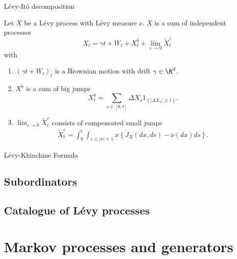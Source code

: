 \begin{frame}
    {L\'evy-It\^o decomposition}
    
    Let $X$ be a L\'evy process with L\'evy measure $\nu$. $X$ is a sum of
    independent processes
    \begin{equation*}
        X_t = \gamma t + W_t + X_t^{b} + \lim_{\varepsilon\to 0} \tilde X^{\varepsilon}_{t}
    \end{equation*}
    with
    \begin{enumerate}
        \item $\left( \gamma t + W_t \right)_{t}$ is a Brownian motion with drift $\gamma \in \R^d$.
        \item $X^b$ is a sum of big jumps
            \begin{equation*}
                X^{b}_t = \sum_{s\in [0,t]} \Delta X_s 1_{ \left\{ | \Delta X_s | \geq 1 \right\}  }.
            \end{equation*}
        \item $\lim_{\varepsilon\to 0}\tilde X^{\varepsilon}_t$ consists of compensated 
            small jumps
            \begin{align*}
                \tilde X^{\varepsilon}_t = \int_{0}^{t} 
                \int_{\varepsilon \leq |x| < 1} 
                x \left\{ J_X(dx,ds) - \nu(dx) ds \right\}.
            \end{align*}
    \end{enumerate}
\end{frame}

\begin{frame}
    {L\'evy-Khinchine Formula}
    
\end{frame}


\subsection{Subordinators}






\subsection{Catalogue of L\'evy processes}


\section{Markov processes and generators}

